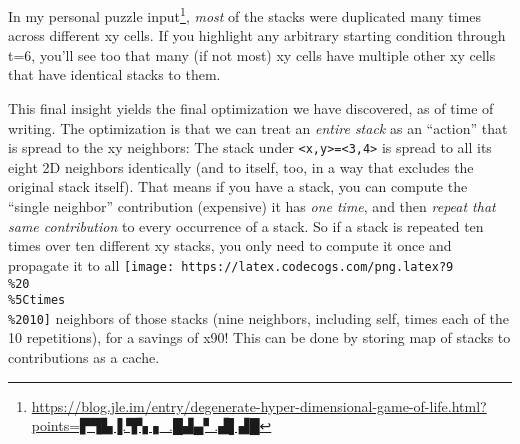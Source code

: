 \documentclass[]{article}
\renewcommand{\href}[2]{#2\footnote{\url{#1}}}
\begin{document}
In my
\href{https://blog.jle.im/entry/degenerate-hyper-dimensional-game-of-life.html?points=▛▜▙▐.▜▚▗_.█▟▄▘.▟▌▟█}{personal
puzzle input}, \emph{most} of the stacks were duplicated many times across
different xy cells. If you highlight any arbitrary starting condition through
t=6, you'll see too that many (if not most) xy cells have multiple other xy
cells that have identical stacks to them.

This final insight yields the final optimization we have discovered, as of time
of writing. The optimization is that we can treat an \emph{entire stack} as an
``action'' that is spread to the xy neighbors: The stack under
\texttt{\textless{}x,y\textgreater{}=\textless{}3,4\textgreater{}} is spread to
all its eight 2D neighbors identically (and to itself, too, in a way that
excludes the original stack itself). That means if you have a stack, you can
compute the ``single neighbor'' contribution (expensive) it has \emph{one time},
and then \emph{repeat that same contribution} to every occurrence of a stack. So
if a stack is repeated ten times over ten different xy stacks, you only need to
compute it once and propagate it to all
\texttt{[image: https://latex.codecogs.com/png.latex?9\\\%20\\\%5Ctimes\\\%2010]}
neighbors of those stacks (nine neighbors, including self, times each of the 10
repetitions), for a savings of x90! This can be done by storing map of stacks to
contributions as a cache.
\end{document}

